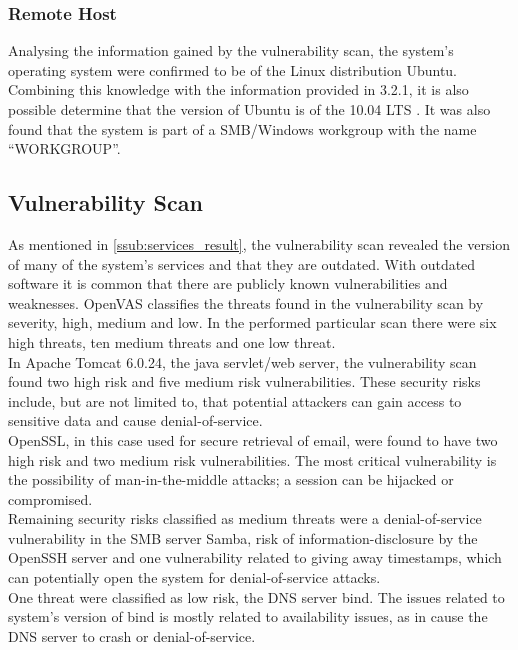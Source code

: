 \subsubsection{Remote Host}

Analysing the information gained by the vulnerability scan, the system's operating system were confirmed to be of the Linux distribution Ubuntu. Combining this knowledge with the information provided in 3.2.1, it is also possible determine that the version of Ubuntu is of the 10.04 LTS \cite{ubuntu, newsletter}. It was also found that the system is part of a SMB/Windows workgroup with the name “WORKGROUP”.


\subsection{Vulnerability Scan}

As mentioned in \ref{ssub:services_result}, the vulnerability scan revealed the version of many of the system's services and that they are outdated. With outdated software it is common that there are publicly known vulnerabilities and weaknesses. OpenVAS classifies the threats found in the vulnerability scan by severity, high, medium and low. In the performed particular scan there were six high threats, ten medium threats and one low threat. \\

\noindent In Apache Tomcat 6.0.24, the java servlet/web server, the vulnerability scan found two high risk and five medium risk vulnerabilities. These security risks include, but are not limited to, that potential attackers can gain access to sensitive data and cause denial-of-service. \\

\noindent OpenSSL, in this case used for secure retrieval of email, were found to have two high risk and two medium risk vulnerabilities. The most critical vulnerability is the possibility of man-in-the-middle attacks; a session can be hijacked or compromised. \\

\noindent Remaining security risks classified as medium threats were a denial-of-service vulnerability in the SMB server Samba, risk of information-disclosure by the OpenSSH server and one vulnerability related to giving away timestamps, which can potentially open the system for denial-of-service attacks. \\

\noindent One threat were classified as low risk, the DNS server bind. The issues related to system's version of bind is mostly related to availability issues, as in cause the DNS server to crash or denial-of-service.
